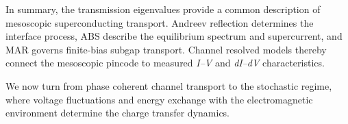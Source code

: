         In summary, the transmission eigenvalues provide a common description of mesoscopic superconducting transport. Andreev reflection determines the interface process, ABS describe the equilibrium spectrum and supercurrent, and MAR governs finite-bias subgap transport. Channel resolved models thereby connect the mesoscopic pincode to measured \textit{I--V} and \textit{dI--dV} characteristics.

        We now turn from phase coherent channel transport to the stochastic regime, where voltage fluctuations and energy exchange with the electromagnetic environment determine the charge transfer dynamics.
